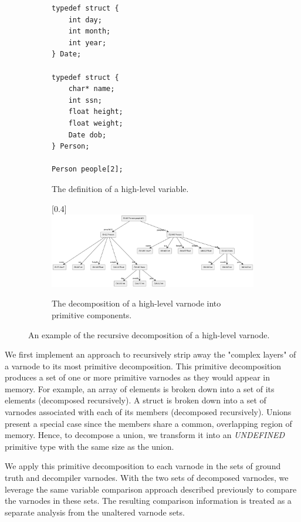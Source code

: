 \documentclass[a4paper,twoside]{article}
\begin{document}
\begin{figure}[tb]
    \begin{subfigure}{0.25\textwidth}
        \centering
        \begin{Verbatim}[frame=single]
typedef struct {
    int day;
    int month;
    int year;
} Date;

typedef struct {
    char* name;
    int ssn;
    float height;
    float weight;
    Date dob;
} Person;

Person people[2];
        \end{Verbatim}
        \caption{The definition of a high-level variable.}
        \label{fig:decompose-src}
    \end{subfigure}
    \hfill
    \begin{subfigure}{0.75\textwidth}
        \scalebox{0.35}[0.4]{\includegraphics{./figures/decompose.png}}
        \caption{The decomposition of a high-level varnode into primitive components.}
        \label{fig:decompose-tree}
    \end{subfigure}
    \caption{An example of the recursive decomposition of a high-level varnode.}
    \label{fig:decompose}
\end{figure}

We first implement an approach to recursively strip away the "complex layers" of a varnode to its most primitive decomposition. This primitive decomposition produces a set of one or more primitive varnodes as they would appear in memory. For example, an array of elements is broken down into a set of its elements (decomposed recursively). A struct is broken down into a set of varnodes associated with each of its members (decomposed recursively). Unions present a special case since the members share a common, overlapping region of memory. Hence, to decompose a union, we transform it into an \emph{UNDEFINED} primitive type with the same size as the union.

We apply this primitive decomposition to each varnode in the sets of ground truth and decompiler varnodes. With the two sets of decomposed varnodes, we leverage the same variable comparison approach described previously to compare the varnodes in these sets. The resulting comparison information is treated as a separate analysis from the unaltered varnode sets.
\end{document}
